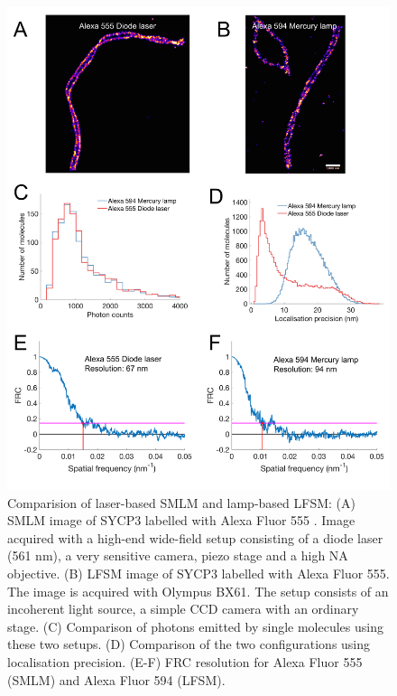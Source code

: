 \documentclass[9pt,twocolumn,twoside]{pnas-new}
\begin{document}
\begin{figure}[h!]
\begin{center}
\includegraphics[width=\linewidth]{Figures/SupFig2.png}
\end{center}
\caption[]{Comparision of laser-based SMLM and lamp-based LFSM: (A) SMLM image of SYCP3 labelled with Alexa Fluor 555 \citep{prakash2015superresolution}. Image acquired with a high-end wide-field setup consisting of a diode laser (561 nm), a very sensitive camera, piezo stage and a high NA objective. (B) LFSM image of SYCP3 labelled with Alexa Fluor 555. The image is acquired with Olympus BX61. The setup consists of an incoherent light source, a simple CCD camera with an ordinary stage. (C) Comparison of photons emitted by single molecules using these two setups. (D) Comparison of the two configurations using localisation precision. (E-F) FRC resolution for Alexa Fluor 555 (SMLM) and Alexa Fluor 594 (LFSM).} \label{fig:comp}
\end{figure}
\end{document}

